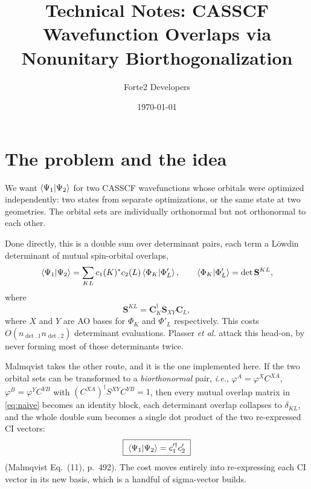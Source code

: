 \documentclass[aip,jcp,preprint]{revtex4-1}
\begin{document}
\title{Technical Notes: CASSCF Wavefunction Overlaps via Nonunitary
Biorthogonalization}
\author{Forte2 Developers}
\noaffiliation
\date{\today}
\maketitle

\section{The problem and the idea}

We want $\braket{\Psi_1|\Psi_2}$ for two CASSCF wavefunctions whose orbitals
were optimized independently: two states from separate optimizations, or the
same state at two geometries. The orbital sets are individually orthonormal
but not orthonormal to each other.

Done directly, this is a double sum over determinant pairs, each term a
L\"owdin determinant of mutual spin-orbital overlaps,\cite{Loewdin1955,Plasser2016}
\begin{equation}
 \braket{\Psi_1|\Psi_2}
 = \sum_{KL} c_1(K)^{*} c_2(L) \braket{\Phi_K|\Phi'_L},
 \qquad
 \braket{\Phi_K|\Phi'_L} = \det \mathbf{S}^{KL},
 \label{eq:naive}
\end{equation}
where
\begin{equation}
    \mathbf{S}^{KL} = \mathbf{C}_K^{\dagger}\mathbf{S}_{XY}\mathbf{C}_L,
\end{equation}
where $X$ and $Y$ are AO bases for $\Phi_K$ and $\Phi'_L$ respectively.
This costs $O(n_{\det,1} n_{\det,2})$ determinant evaluations. Plasser
\emph{et al.}\cite{Plasser2016} attack this head-on, by never forming most of
those determinants twice.

Malmqvist\cite{Malmqvist1986} takes the other route, and it is the one
implemented here. If the two orbital sets can be transformed to a
\emph{biorthonormal} pair, \textit{i.e.}, $\varphi^A = \varphi^X C^{XA}$,
$\varphi^B = \varphi^Y C^{YB}$ with $(C^{XA})^\dagger S^{XY} C^{YB} = 1$,
then every mutual overlap matrix in \cref{eq:naive} becomes an identity block,
each determinant overlap collapses to $\delta_{KL}$, and the whole double sum
becomes a single dot product of the two re-expressed CI vectors:
\begin{equation}
 \boxed{\;\braket{\Psi_1|\Psi_2} = c_1'^\dagger c_2'\;}
 \label{eq:payoff}
\end{equation}
(Malmqvist Eq.~(11), p.~492). The cost moves entirely into re-expressing each
CI vector in its new basis, which is a handful of sigma-vector builds.
\end{document}
